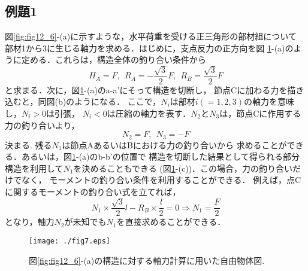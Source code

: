\documentclass[10pt,a4j]{jarticle}
\begin{document}
\subsection{例題1}
図\ref{fig:fig12_6}-(a)に示すような，水平荷重を受ける正三角形の部材組について
部材1から3に生じる軸力を求める．はじめに，支点反力の正方向を図
\ref{fig:fig12_7}-(a)のように定める．これらは，構造全体の釣り合い条件から
\begin{equation}
	H_A=F, \ \ 
	R_A=-\frac{\sqrt{3}}{2}F, \ \ 
	R_B= \frac{\sqrt{3}}{2}F
\end{equation}
と求まる．次に，図\ref{fig:fig12_7}-(a)のa-a'にそって構造を切断し，
節点Cに加わる力を描き込むと，同図(b)のようになる．
ここで，$N_i$は部材$i(=1,2,3)$の軸力を意味し，$N_i>0$は引張，
$N_i<0$は圧縮の軸力を表す．$N_2$と$N_3$は，節点Cに作用する力の釣り合いより，
\begin{equation}
	N_2=F, \ \ N_3=-F
\end{equation}
決まる.  残る$N_1$は節点AあるいはBにおける力の釣り合いから
求めることができる．あるいは，図\ref{fig:fig12_7}-(a)のb-b'の位置で
構造を切断した結果として得られる部分構造を利用して$N_1$を決めることもできる
(図\ref{fig:fig12_7}-(c))．この場合，力の釣り合いだけでなく，
モーメントの釣り合い条件を利用することができる．
例えば，点Cに関するモーメントの釣り合い式を立てれば，
\begin{equation}
	N_1\times \frac{\sqrt{3}}{2}l -R_B\times \frac{l}{2}=0 \Rightarrow
	N_1=\frac{F}{2}
\end{equation}
となり，軸力$N_2$が未知でも$N_1$を直接求めることができる．
\begin{figure}[h]
	\begin{center}
	\texttt{[image: ./fig7.eps]} 
	\end{center}
	\caption{
		図\ref{fig:fig12_6}-(a)の構造に対する軸力計算に用いた自由物体図.
	} 
	\label{fig:fig12_7}
\end{figure}
\end{document}
